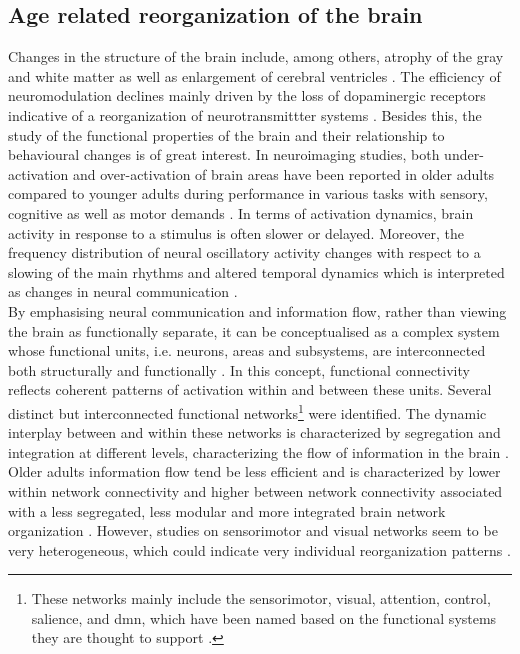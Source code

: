 \subsection{Age related reorganization of the brain}
\label{theory:aging:brain}
Changes in the structure of the brain include, among others, atrophy of the gray and white matter as well as enlargement of cerebral ventricles \cite{Fjell2010}. The efficiency of neuromodulation declines mainly driven by the loss of dopaminergic receptors indicative of a reorganization of neurotransmittter systems \cite{Li2001}. Besides this, the study of the functional properties of the brain and their relationship to behavioural changes is of great interest. In neuroimaging studies, both under-activation and over-activation of brain areas have been reported in older adults compared to younger adults during performance in various tasks with sensory, cognitive as well as motor demands \cite{Reuter-Lorenz2010, Sala-Llonch2015}. In terms of activation dynamics, brain activity in response to a stimulus is often slower or delayed. Moreover, the frequency distribution of neural oscillatory activity changes with respect to a slowing of the main rhythms and altered temporal dynamics which is interpreted as changes in neural communication \cite{Courtney2021}.\\ 
By emphasising neural communication and information flow, rather than viewing the brain as functionally separate, it can be conceptualised as a complex system whose functional units, i.e. neurons, areas and subsystems, are interconnected both structurally and functionally \cite{Friston2011,Deery2023}. In this concept, functional connectivity reflects coherent patterns of activation within and between these units. Several distinct but interconnected functional networks\footnote{These networks mainly include the sensorimotor, visual, attention, control, salience, and \gls{dmn}, which have been named based on the functional systems they are thought to support \cite{Uddin2019}.} were identified. The dynamic interplay between and within these networks is characterized by segregation and integration at different levels, characterizing the flow of information in the brain \cite{Sporns2013}. Older adults information flow tend be less efficient and is characterized by lower within network connectivity and higher between network connectivity associated with a less segregated, less modular and more integrated brain network organization \cite{Sala-Llonch2015,Deery2023, Betzel2014}. However, studies on sensorimotor and visual networks seem to be very heterogeneous, which could indicate very individual reorganization patterns \cite{Deery2023}.

